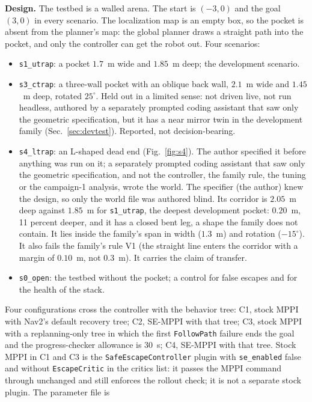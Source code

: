 \documentclass[journal]{IEEEtran}
\begin{document}
\textbf{Design.} The testbed is a walled arena. The start is $(-3,0)$ and the goal
$(3,0)$ in every scenario. The localization map is an empty box, so the pocket is absent
from the planner's map: the global planner draws a straight path into the pocket, and
only the controller can get the robot out. Four scenarios:
\begin{itemize}
\item \texttt{s1\_utrap}: a pocket $1.7$~m wide and $1.85$~m deep; the development
  scenario.
\item \texttt{s3\_ctrap}: a three-wall pocket with an oblique back wall, $2.1$~m wide
  and $1.45$~m deep, rotated $25^\circ$. Held out in a limited sense: not driven live, not run headless,
  authored by a separately prompted coding assistant that saw only the geometric
  specification, but it has a near mirror twin in the
  development family (Sec.~\ref{sec:devtest}). Reported, not decision-bearing.
\item \texttt{s4\_ltrap}: an L-shaped dead end (Fig.~\ref{fig:s4}). The author specified it
  before anything was run on it; a separately prompted coding assistant that saw only the
  geometric specification, and not the controller, the family rule, the tuning or the
  campaign-1 analysis, wrote the world. The specifier (the author) knew the design, so only
  the world file was authored blind. Its corridor is $2.05$~m deep against $1.85$~m for
  \texttt{s1\_utrap}, the deepest development pocket: $0.20$~m, 11 percent deeper, and
  it has a closed bent leg, a shape the family does not contain. It lies inside the family's
  span in width ($1.3$~m) and rotation ($-15^\circ$). It also fails the family's rule V1
  (the straight line enters the corridor with a margin of $0.10$~m, not $0.3$~m). It carries the claim of transfer.
\item \texttt{s0\_open}: the testbed without the pocket; a control for false escapes and for
  the health of the stack.
\end{itemize}
Four configurations cross the controller with the behavior tree: C1, stock MPPI with
Nav2's default recovery tree; C2, SE-MPPI with that tree; C3, stock MPPI with a
replanning-only tree in which the first \texttt{FollowPath} failure ends the goal and
the progress-checker allowance is $30$~s; C4, SE-MPPI with that tree. Stock MPPI in C1 and C3 is the \texttt{SafeEscapeController}
plugin with \texttt{se\_enabled} false and without \texttt{EscapeCritic} in the critics
list: it passes the MPPI command through unchanged and
still enforces the rollout check; it is not a separate stock plugin. The parameter file is
\end{document}
